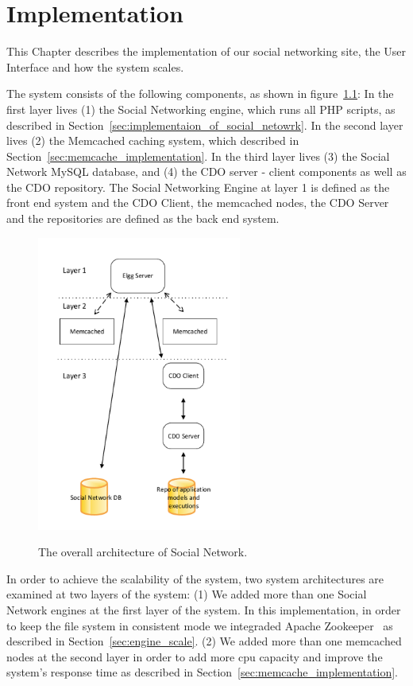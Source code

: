 
\chapter{Implementation}
\label{chap:implementation}
This Chapter describes the implementation of our social networking site, the User Interface and how the system scales.

The system consists of the following components, as shown in figure~\ref{fig:system_architecture}: In the first layer lives (1) the Social Networking engine, which runs all PHP scripts, as described in Section~\ref{sec:implementaion_of_social_netowrk}. 
In the second layer lives (2) the Memcached caching system, which described in Section~\ref{sec:memcache_implementation}. 
In the third layer lives (3) the Social Network MySQL database, and (4) the CDO server - client components as well as the CDO repository. The Social Networking Engine at layer 1 is defined as the front end system and the CDO Client, the memcached nodes, the CDO Server and the repositories are defined as the back end system. 

\begin{figure}[h]
	\caption{The overall architecture of Social Network.}
	\includegraphics[width=0.6\textwidth,natwidth=200,natheight=150]{./fig/system_architecture.pdf}
	\centering
	\label{fig:system_architecture}
\end{figure}

In order to achieve the scalability of the system, two system architectures are examined at two layers of the system: (1) We added more than one Social Network engines at the first layer of the system. In this implementation, in order to keep the file system in consistent mode we integraded Apache Zookeeper~\cite{zookeeper_url} as described in Section~\ref{sec:engine_scale}. (2) We added more than one memcached nodes at the second layer in order to add more cpu capacity and improve the system's response time as described in Section~\ref{sec:memcache_implementation}.

